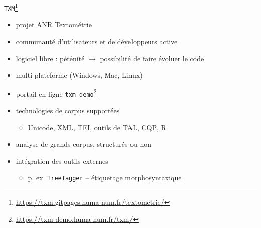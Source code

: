 \documentclass[xetex,xcolor={table,usenames,dvipsnames}]{beamer}
\begin{document}
\begin{frame}{\texttt{TXM}\footnote{\url{https://txm.gitpages.huma-num.fr/textometrie/}}}
\begin{itemize}
	\item projet \textsc{ANR} \og{}Textométrie\fg{}
	\item communauté d'utilisateurs et de développeurs active
	\item logiciel libre : pérénité $\rightarrow$ possibilité de faire évoluer le code
	\item multi-plateforme (Windows, Mac, Linux)
	\item portail en ligne \texttt{txm-demo}\footnote{\url{https://txm-demo.huma-num.fr/txm/}}
	\item technologies de corpus supportées
	\begin{itemize}
		\item Unicode, \textsc{XML}, \textsc{TEI}, outils de \textsc{TAL}, \textsc{CQP}, \textsc{R}
		\end{itemize}
	\item analyse de grands corpus, structurés ou non
	\item intégration des outils externes 
	\begin{itemize}
		\item p. ex. \texttt{TreeTagger} -- étiquetage morphosyntaxique
		\end{itemize}
\end{itemize}
\end{frame}
\end{document}

